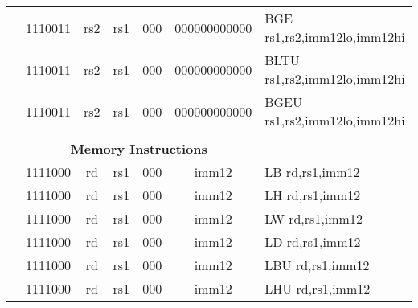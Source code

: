 \begin{table}[p]
\begin{small}
\begin{center}
\begin{tabular}{rcccccccccccl}
&
\multicolumn{2}{|c|}{1110011} &
\multicolumn{1}{c|}{rs2} &
\multicolumn{1}{c|}{rs1} &
\multicolumn{2}{c|}{000} &
\multicolumn{5}{c|}{000000000000} & BGE rs1,rs2,imm12lo,imm12hi \\
\cline{2-12}
  

&
\multicolumn{2}{|c|}{1110011} &
\multicolumn{1}{c|}{rs2} &
\multicolumn{1}{c|}{rs1} &
\multicolumn{2}{c|}{000} &
\multicolumn{5}{c|}{000000000000} & BLTU rs1,rs2,imm12lo,imm12hi \\
\cline{2-12}
  

&
\multicolumn{2}{|c|}{1110011} &
\multicolumn{1}{c|}{rs2} &
\multicolumn{1}{c|}{rs1} &
\multicolumn{2}{c|}{000} &
\multicolumn{5}{c|}{000000000000} & BGEU rs1,rs2,imm12lo,imm12hi \\
\cline{2-12}
  

&
\multicolumn{11}{c}{} & \\
&
\multicolumn{11}{c}{\bf Memory Instructions} & \\
\cline{2-12}
  

&
\multicolumn{2}{|c|}{1111000} &
\multicolumn{1}{c|}{rd} &
\multicolumn{1}{c|}{rs1} &
\multicolumn{2}{c|}{000} &
\multicolumn{5}{c|}{imm12} & LB rd,rs1,imm12 \\
\cline{2-12}
  

&
\multicolumn{2}{|c|}{1111000} &
\multicolumn{1}{c|}{rd} &
\multicolumn{1}{c|}{rs1} &
\multicolumn{2}{c|}{000} &
\multicolumn{5}{c|}{imm12} & LH rd,rs1,imm12 \\
\cline{2-12}
  

&
\multicolumn{2}{|c|}{1111000} &
\multicolumn{1}{c|}{rd} &
\multicolumn{1}{c|}{rs1} &
\multicolumn{2}{c|}{000} &
\multicolumn{5}{c|}{imm12} & LW rd,rs1,imm12 \\
\cline{2-12}
  

&
\multicolumn{2}{|c|}{1111000} &
\multicolumn{1}{c|}{rd} &
\multicolumn{1}{c|}{rs1} &
\multicolumn{2}{c|}{000} &
\multicolumn{5}{c|}{imm12} & LD rd,rs1,imm12 \\
\cline{2-12}
  

&
\multicolumn{2}{|c|}{1111000} &
\multicolumn{1}{c|}{rd} &
\multicolumn{1}{c|}{rs1} &
\multicolumn{2}{c|}{000} &
\multicolumn{5}{c|}{imm12} & LBU rd,rs1,imm12 \\
\cline{2-12}
  

&
\multicolumn{2}{|c|}{1111000} &
\multicolumn{1}{c|}{rd} &
\multicolumn{1}{c|}{rs1} &
\multicolumn{2}{c|}{000} &
\multicolumn{5}{c|}{imm12} & LHU rd,rs1,imm12 \\
\cline{2-12}
  


\end{tabular}
\end{center}
\end{small}
\end{table}
